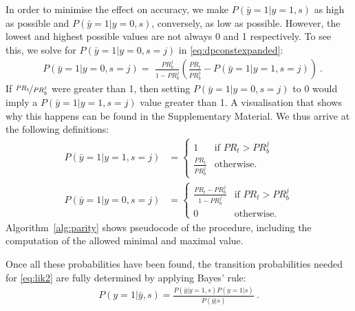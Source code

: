 In order to minimise the effect on accuracy,
we make $P(\bar{y}=1|y=1,s)$ as high as possible and $P(\bar{y}=1|y=0,s)$, conversely, as low as possible.
However, the lowest and highest possible values are not always 0 and 1 respectively.
To see this, we solve for $P(\bar{y}=1|y=0,s=j)$ in \eqref{eq:dpconstexpanded}:
\begin{align}
  &P(\bar{y}=1|y=0,s=j) %
  =\,\, \frac{\mathit{PR}_b^j}{1-\mathit{PR}_b^j} \left(\frac{\mathit{PR}_t}{\mathit{PR}_b^j} - P(\bar{y}=1|y=1,s=j)\right)~.
\end{align}
If $\nicefrac{\mathit{PR}_t}{\mathit{PR}_b^j}$ were greater than 1,
then setting $P(\bar{y}=1|y=0,s=j)$ to 0
would imply a $P(\bar{y}=1|y=1,s=j)$ value greater than 1.
A visualisation that shows why this happens can be found in the Supplementary Material.
We thus arrive at the following definitions:
\begin{align}
  P(\bar{y}=1|y=1,s=j)&=\begin{cases}
    1 &\text{if }\mathit{PR}_t>\mathit{PR}_b^j\\
    \frac{\mathit{PR}_t}{\mathit{PR}_b^j} &\text{otherwise.}
  \end{cases}%
  \label{eq:tau-11}\\
  P(\bar{y}=1|y=0,s=j)&=\begin{cases}
    \frac{\mathit{PR}_t-\mathit{PR}_b^j}{1-\mathit{PR}_b^j} &\text{if }\mathit{PR}_t>\mathit{PR}_b^j\\
    0 &\text{otherwise.}
  \end{cases}%
  \label{eq:tau-01}
\end{align}
Algorithm~\ref{alg:parity} shows pseudocode of the procedure, including the computation of the allowed minimal and maximal value.

Once all these probabilities have been found, the transition probabilities needed for \eqref{eq:lik2}
are fully determined by applying Bayes' rule:
\begin{align}
  P(y=1|\bar{y}, s) = \frac{P(\bar{y}|y=1, s)
  P(y=1|s)}{P(\bar{y}|s)}~. \label{eq:debias}
\end{align}

